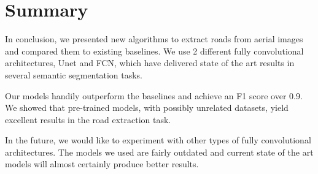 \section{Summary}
In conclusion, we presented new algorithms to extract roads from aerial images and compared them to existing baselines. We use 2 different fully convolutional architectures, Unet and FCN, which have delivered state of the art results in several semantic segmentation tasks.

Our models handily outperform the baselines and achieve an F1 score over 0.9. We showed that pre-trained models, with possibly unrelated datasets, yield excellent results in the road extraction task.

In the future, we would like to experiment with other types of fully convolutional architectures. The models we used are fairly outdated and current state of the art models will almost certainly produce better results.
